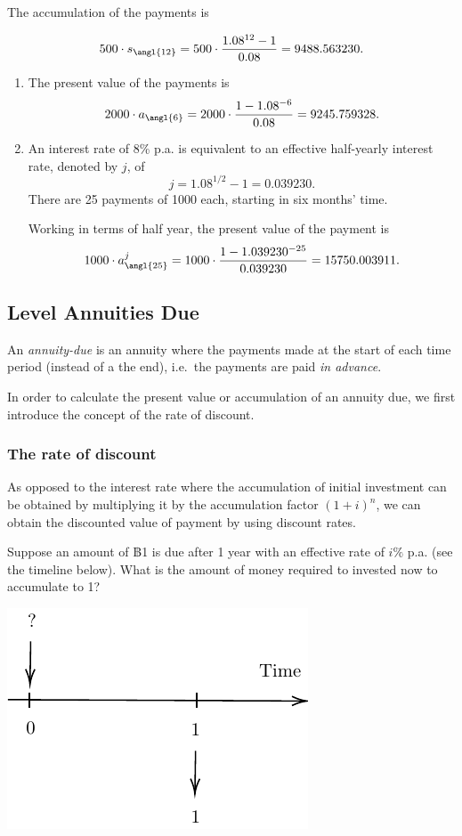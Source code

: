 \documentclass[
]{book}
\theoremstyle{definition}
\theoremstyle{definition}
\theoremstyle{definition}
\theoremstyle{definition}
\theoremstyle{remark}
\begin{document}
The accumulation of the payments is

\[500 \cdot s_\angl{12}  = 500 \cdot \frac{1.08^{12} - 1 }{0.08 } = 9488.563230.\]

\begin{enumerate}
\def\labelenumi{\arabic{enumi}.}
\setcounter{enumi}{1}
\item
  The present value of the payments is
  \[2000\cdot a_\angl{6}  = 2000 \cdot \frac{1 - 1.08^{-6} }{0.08 } = 9245.759328.\]
\item
  An interest rate of 8\% p.a. is equivalent to an effective
  half-yearly interest rate, denoted by \(j\), of
  \[j = 1.08^{1/2} -1 = 0.039230.\] There are 25 payments of 1000
  each, starting in six months' time.

  Working in terms of half year, the present value of the payment is
  \[1000 \cdot a^j_\angl{25} = 1000 \cdot \frac{1 - 1.039230^{-25} }{0.039230 } = 15750.003911.\]
\end{enumerate}

\subsection{Level Annuities Due}\label{level-annuities-due}

An \emph{annuity-due} is an annuity where the payments made at the start of
each time period (instead of a the end), i.e.~the payments are paid \emph{in
advance}.

In order to calculate the present value or accumulation of an annuity
due, we first introduce the concept of the rate of discount.

\subsubsection*{The rate of discount}\label{the-rate-of-discount}

As opposed to the interest rate where the accumulation of initial
investment can be obtained by multiplying it by the accumulation factor
\((1+i)^n\), we can obtain the discounted value of payment by using
discount rates.

Suppose an amount of ฿1 is due after 1 year with an effective rate of
\(i \%\) p.a. (see the timeline below). What is the amount of money
required to invested now to accumulate to 1?

\begin{center}\includegraphics{SCMA266Bookdownproj_files/figure-latex/tikz-ex12-1} \end{center}
\end{document}
